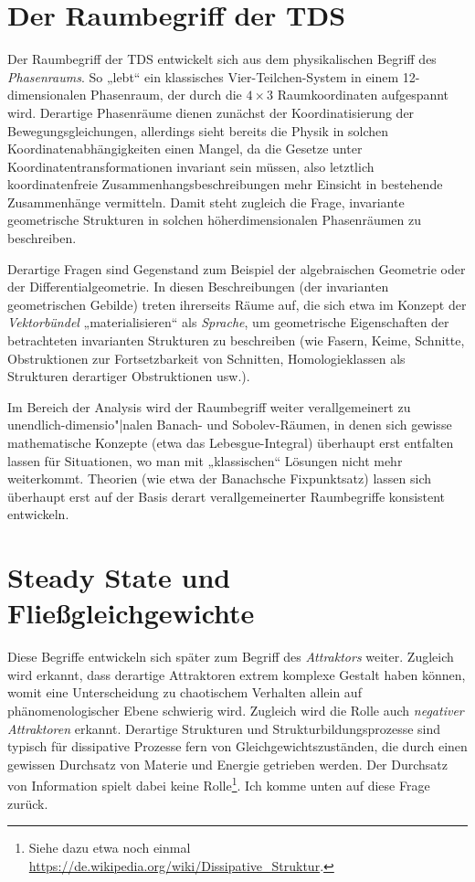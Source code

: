 \documentclass[11pt,a4paper]{article}
\begin{document}
\section{Der Raumbegriff der TDS}

Der Raumbegriff der TDS entwickelt sich aus dem physikalischen Begriff des
\emph{Phasenraums}. So „lebt“ ein klassisches Vier-Teilchen-System in einem
12-dimensionalen Phasenraum, der durch die $4\times 3$ Raumkoordinaten
aufgespannt wird. Derartige Phasenräume dienen zunächst der Koordinatisierung
der Bewegungsgleichungen, allerdings sieht bereits die Physik in solchen
Koordinatenabhängigkeiten einen Mangel, da die Gesetze unter
Koordinatentransformationen invariant sein müssen, also letztlich
koordinatenfreie Zusammenhangsbeschreibungen mehr Einsicht in bestehende
Zusammenhänge vermitteln. Damit steht zugleich die Frage, invariante
geometrische Strukturen in solchen höherdimensionalen Phasenräumen zu
beschreiben.

Derartige Fragen sind Gegenstand zum Beispiel der algebraischen Geometrie oder
der Differentialgeometrie. In diesen Beschreibungen (der invarianten
geometrischen Gebilde) treten ihrerseits Räume auf, die sich etwa im Konzept
der \emph{Vektorbündel} „materialisieren“ als \emph{Sprache}, um geometrische
Eigenschaften der betrachteten invarianten Strukturen zu beschreiben (wie
Fasern, Keime, Schnitte, Obstruktionen zur Fortsetzbarkeit von Schnitten,
Homologieklassen als Strukturen derartiger Obstruktionen usw.).

Im Bereich der Analysis wird der Raumbegriff weiter verallgemeinert zu
unendlich-dimensio"|nalen Banach- und Sobolev-Räumen, in denen sich gewisse
mathematische Konzepte (etwa das Lebesgue-Integral) überhaupt erst entfalten
lassen für Situationen, wo man mit „klassischen“ Lösungen nicht mehr
weiterkommt.  Theorien (wie etwa der Banachsche Fixpunktsatz) lassen sich
überhaupt erst auf der Basis derart verallgemeinerter Raumbegriffe konsistent
entwickeln.

\section{Steady State und Fließgleichgewichte}

Diese Begriffe entwickeln sich später zum Begriff des \emph{Attraktors}
weiter.  Zugleich wird erkannt, dass derartige Attraktoren extrem komplexe
Gestalt haben können, womit eine Unterscheidung zu chaotischem Verhalten
allein auf phänomenologischer Ebene schwierig wird.  Zugleich wird die Rolle
auch \emph{negativer Attraktoren} erkannt.  Derartige Strukturen und
Strukturbildungsprozesse sind typisch für dissipative Prozesse fern von
Gleichgewichtszuständen, die durch einen gewissen Durchsatz von Materie und
Energie getrieben werden. Der Durchsatz von Information spielt dabei keine
Rolle\footnote{Siehe dazu etwa noch einmal
  \url{https://de.wikipedia.org/wiki/Dissipative_Struktur}.}. Ich komme unten
auf diese Frage zurück.
\end{document}
